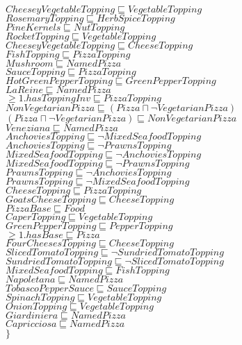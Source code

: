 \documentclass[a4paper,10pt]{article}
\begin{document}
 $CheeseyVegetableTopping \sqsubseteq VegetableTopping$\\ 
 $RosemaryTopping \sqsubseteq HerbSpiceTopping$\\ 
 $PineKernels \sqsubseteq NutTopping$\\ 
 $RocketTopping \sqsubseteq VegetableTopping$\\ 
 $CheeseyVegetableTopping \sqsubseteq CheeseTopping$\\ 
 $FishTopping \sqsubseteq PizzaTopping$\\ 
 $Mushroom \sqsubseteq NamedPizza$\\ 
 $SauceTopping \sqsubseteq PizzaTopping$\\ 
 $HotGreenPepperTopping \sqsubseteq GreenPepperTopping$\\ 
 $LaReine \sqsubseteq NamedPizza$\\ 
 $ \ge 1.hasToppingInv \sqsubseteq PizzaTopping$\\ 
 $NonVegetarianPizza \sqsubseteq  ( Pizza   \sqcap    \lnot VegetarianPizza ) $\\ 
 $ ( Pizza   \sqcap    \lnot VegetarianPizza )  \sqsubseteq NonVegetarianPizza$\\ 
 $Veneziana \sqsubseteq NamedPizza$\\ 
 $AnchoviesTopping \sqsubseteq  \lnot MixedSeafoodTopping$\\ 
 $AnchoviesTopping \sqsubseteq  \lnot PrawnsTopping$\\ 
 $MixedSeafoodTopping \sqsubseteq  \lnot AnchoviesTopping$\\ 
 $MixedSeafoodTopping \sqsubseteq  \lnot PrawnsTopping$\\ 
 $PrawnsTopping \sqsubseteq  \lnot AnchoviesTopping$\\ 
 $PrawnsTopping \sqsubseteq  \lnot MixedSeafoodTopping$\\ 
 $CheeseTopping \sqsubseteq PizzaTopping$\\ 
 $GoatsCheeseTopping \sqsubseteq CheeseTopping$\\ 
 $PizzaBase \sqsubseteq Food$\\ 
 $CaperTopping \sqsubseteq VegetableTopping$\\ 
 $GreenPepperTopping \sqsubseteq PepperTopping$\\ 
 $ \ge 1.hasBase \sqsubseteq Pizza$\\ 
 $FourCheesesTopping \sqsubseteq CheeseTopping$\\ 
 $SlicedTomatoTopping \sqsubseteq  \lnot SundriedTomatoTopping$\\ 
 $SundriedTomatoTopping \sqsubseteq  \lnot SlicedTomatoTopping$\\ 
 $MixedSeafoodTopping \sqsubseteq FishTopping$\\ 
 $Napoletana \sqsubseteq NamedPizza$\\ 
 $TobascoPepperSauce \sqsubseteq SauceTopping$\\ 
 $SpinachTopping \sqsubseteq VegetableTopping$\\ 
 $OnionTopping \sqsubseteq VegetableTopping$\\ 
 $Giardiniera \sqsubseteq NamedPizza$\\ 
 $Capricciosa \sqsubseteq NamedPizza$\\ 
 $\}$ 
\end{document}
